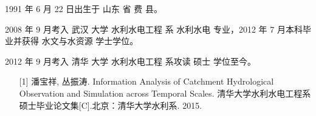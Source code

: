 \begin{resume}


  1991 年 6 月 22 日出生于 山东 省 费 县。
  
  2008 年 9 月考入 武汉 大学 水利水电工程 系 水利水电 专业，2012 年 7 月本科毕业并获得 水文与水资源 学士学位。
  
  2012 年 9 月考入 清华 大学 水利水电工程 系攻读 硕士 学位至今。


\begin{enumerate}
\item[{[}1{]}] 潘宝祥, 丛振涛. Information Analysis of Catchment Hydrological Observation and Simulation across Temporal Scales. 清华大学水利水电工程系硕士毕业论文集[C].北京：清华大学水利系. 2015.
\end{enumerate}


\end{resume}
